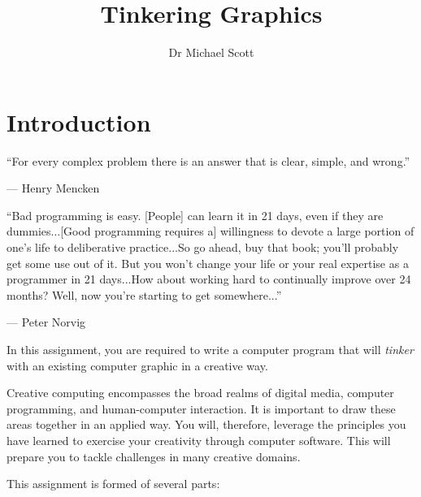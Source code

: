 \documentclass{../../fal_assignment}
\title{Tinkering Graphics}
\author{Dr Michael Scott}
\begin{document}
\maketitle

\section*{Introduction}

\begin{marginquote}
``For every complex problem there is an answer that is clear, simple, and wrong.''

--- Henry Mencken

\marginquoterule

``Bad programming is easy. [People] can learn it in 21 days, even if they are dummies...[Good programming requires a] willingness to devote a large portion of one's life to deliberative practice...So go ahead, buy that book; you'll probably get some use out of it. But you won't change your life or your real expertise as a programmer in 21 days...How about working hard to continually improve over 24 months? Well, now you're starting to get somewhere...''
\par --- Peter Norvig

\end{marginquote}

In this assignment, you are required to write a computer program that will \textit{tinker} with an existing computer graphic in a creative way.

Creative computing encompasses the broad realms of digital media, computer programming, and human-computer interaction. It is important to draw these areas together in an applied way. You will, therefore, leverage the principles you have learned to exercise your creativity through computer software. This will prepare you to tackle challenges in many creative domains.

This assignment is formed of several parts:
\end{document}
